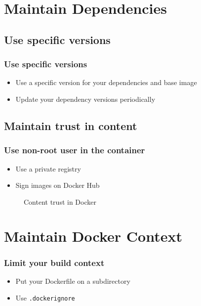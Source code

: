 \documentclass[10pt, compress]{beamer}
\begin{document}
\section{Maintain Dependencies}

\subsection{Use specific versions}

\begin{frame}[fragile]
  \frametitle{Use specific versions}
  
  \begin{itemize}
      \item Use a specific version for your dependencies and base image
      \item Update your dependency versions periodically
  \end{itemize}
\end{frame}

\subsection{Maintain trust in content}

\begin{frame}[fragile]
  \frametitle{Use non-root user in the container}
  
  \begin{itemize}
      \item Use a private registry
      \item Sign images on Docker Hub
  \end{itemize}
  
  \begin{figure}
      \centering
      \caption{Content trust in Docker}
  \end{figure}
\end{frame}

\section{Maintain Docker Context}

\begin{frame}[fragile]
  \frametitle{Limit your build context}
  
  \begin{itemize}
      \item Put your Dockerfile on a subdirectory
      \item Use \texttt{.dockerignore}
  \end{itemize}
\end{frame}
\end{document}
